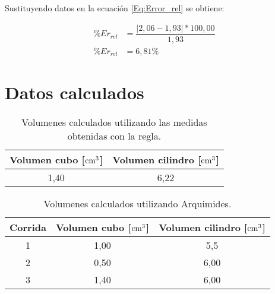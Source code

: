 \documentclass[12pt,letterpaper]{article}
\newcommand{\abs}[1]{\lvert#1\rvert}
\begin{document}
Sustituyendo datos en la ecuación \ref{Eq:Error_rel} se obtiene:

\begin{align*}
\% Er_{rel} &= \dfrac{\abs{2,06 - 1,93}*100,00}{1,93}\\
\% Er_{rel} &= 6,81 \%
\end{align*}


\section{Datos calculados}


\begin{table}[H]
\begin{center}

\begin{tabular}{|c|c|}
\hline 
\textbf{Volumen cubo} [$\textup{cm}^{3}$] & \textbf{Volumen cilindro} [$\textup{cm}^{3}$] \\ 
\hline 
1,40 & 6,22 \\ 
\hline 
\end{tabular} 

\caption{Volumenes calculados utilizando las medidas obtenidas con la regla.}

\label{Tab:vol_regla}
\end{center}
\end{table}






\begin{table}[H]
\begin{center}

\begin{tabular}{|c|c|c|}
\hline 
\textbf{Corrida} & \textbf{Volumen cubo} [$\textup{cm}^{3}$] & \textbf{Volumen cilindro} [$\textup{cm}^{3}$] \\ 
\hline 
1 & 1,00 & 5,5 \\ 
\hline 
2 & 0,50 & 6,00 \\ 
\hline 
3 & 1,40 & 6,00 \\ 
\hline 
\end{tabular} 

\caption{Volumenes calculados utilizando Arquimides.}

\label{Tab:vol_arq}
\end{center}
\end{table}
\end{document}

